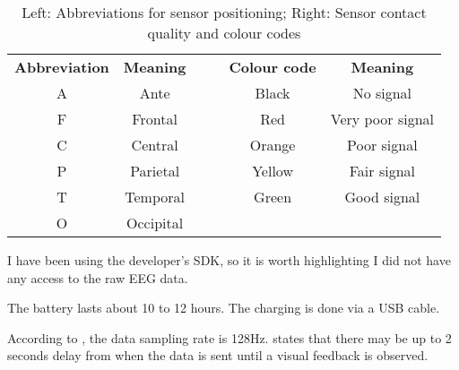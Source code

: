 \begin{table}[h]
\centering
\begin{tabular}{|c|c|llcc}
\cline{1-2} \cline{5-6}
\textbf{Abbreviation} & \textbf{Meaning} &  & \multicolumn{1}{l|}{} & \multicolumn{1}{c|}{\textbf{Colour code}}          & \multicolumn{1}{c|}{\textbf{Meaning}} \\ \cline{1-2} \cline{5-6} 
A                     & Ante             &  & \multicolumn{1}{l|}{} & \multicolumn{1}{c|}{Black}                         & \multicolumn{1}{c|}{No signal}        \\ \cline{1-2} \cline{5-6} 
F                     & Frontal          &  & \multicolumn{1}{l|}{} & \multicolumn{1}{c|}{{\color[HTML]{FE0000} Red}}    & \multicolumn{1}{c|}{Very poor signal} \\ \cline{1-2} \cline{5-6} 
C                     & Central          &  & \multicolumn{1}{l|}{} & \multicolumn{1}{c|}{{\color[HTML]{F8A102} Orange}} & \multicolumn{1}{c|}{Poor signal}      \\ \cline{1-2} \cline{5-6} 
P                     & Parietal         &  & \multicolumn{1}{l|}{} & \multicolumn{1}{c|}{{\color[HTML]{F8FF00} Yellow}} & \multicolumn{1}{c|}{Fair signal}      \\ \cline{1-2} \cline{5-6} 
T                     & Temporal         &  & \multicolumn{1}{l|}{} & \multicolumn{1}{c|}{{\color[HTML]{32CB00} Green}}  & \multicolumn{1}{c|}{Good signal}      \\ \cline{1-2} \cline{5-6} 
O                     & Occipital        &  &                       & \multicolumn{1}{l}{}                               & \multicolumn{1}{l}{}                  \\ \cline{1-2}
\end{tabular}
\caption {Left: Abbreviations for sensor positioning; Right: Sensor contact quality and colour codes}
\label{table:sensorName}
\end{table}

I have been using the developer's SDK, so it is worth highlighting I did not have any access to the raw EEG data. 

The battery lasts about 10 to 12 hours. The charging is done via a USB cable.

According to \cite{experimenterEPOC}, the data sampling rate is 128Hz. \cite{emotivUserManual} states that there may be up to 2 seconds delay from when the data is sent until a visual feedback is observed. 

